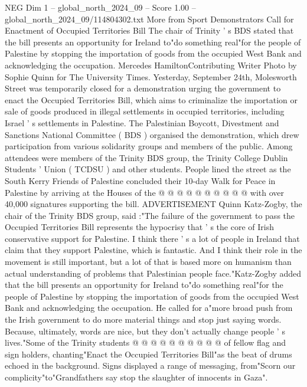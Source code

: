 \begin{textsample}{NEG Dim 1 – global\_north\_2024\_09 – Score 1.00 – global\_north\_2024\_09/114804302.txt}  \label{ex:f1_neg_023}
More from Sport Demonstrators Call for Enactment of Occupied Territories Bill The chair of Trinity ' s BDS stated that the bill presents an opportunity for Ireland to"do something real"for the people of Palestine by stopping the importation of goods from the occupied West Bank and acknowledging the occupation.
Mercedes HamiltonContributing Writer Photo by Sophie Quinn for The University Times.
Yesterday, September 24th, Molesworth Street was temporarily closed for a demonstration urging the government to enact the Occupied Territories Bill, which aims to criminalize the importation or sale of goods produced in illegal settlements in occupied territories, including Israel ' s settlements in Palestine.
The Palestinian Boycott, Divestment and Sanctions National Committee ( BDS ) organised the demonstration, which drew participation from various solidarity groups and members of the public.
Among attendees were members of the Trinity BDS group, the Trinity College Dublin Students ' Union ( TCDSU ) and other students.
People lined the street as the South Kerry Friends of Palestine concluded their 10-day Walk for Peace in Palestine by arriving at the Houses of the @ @ @ @ @ @ @ @ @ @ with over 40,000 signatures supporting the bill.
ADVERTISEMENT Quinn Katz-Zogby, the chair of the Trinity BDS group, said :"The failure of the government to pass the Occupied Territories Bill represents the hypocrisy that ' s the core of Irish conservative support for Palestine.
I think there ' s a lot of people in Ireland that claim that they support Palestine, which is fantastic.
And I think their role in the movement is still important, but a lot of that is based more on humanism than actual understanding of problems that Palestinian people face."Katz-Zogby added that the bill presents an opportunity for Ireland to"do something real"for the people of Palestine by stopping the importation of goods from the occupied West Bank and acknowledging the occupation.
He called for a"more broad push from the Irish government to do more material things and stop just saying words.
Because, ultimately, words are nice, but they don't actually change people ' s lives."Some of the Trinity students @ @ @ @ @ @ @ @ @ @ of fellow flag and sign holders, chanting"Enact the Occupied Territories Bill"as the beat of drums echoed in the background.
Signs displayed a range of messaging, from"Scorn our complicity"to"Grandfathers say stop the slaughter of innocents in Gaza".

\end{textsample}
